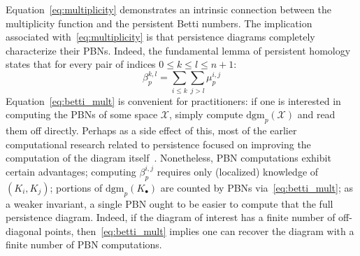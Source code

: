 Equation~\eqref{eq:multiplicity} demonstrates an intrinsic connection between the multiplicity function and the persistent Betti numbers. 
The implication associated with~\eqref{eq:multiplicity} is that persistence diagrams completely characterize their PBNs.
Indeed, the fundamental lemma of persistent homology~\cite{edelsbrunner2022computational} states that for every pair of indices $0 \leq k \leq l \leq n+1$: 
\begin{equation}\label{eq:betti_mult}
	\beta_p^{k,l} = \sum\limits_{i \leq k} \sum\limits_{j > l} \mu_p^{i,j}
\end{equation}
Equation~\eqref{eq:betti_mult} is convenient for practitioners: if one is interested in computing the PBNs of some space $\mathcal{X}$, simply compute $\mathrm{dgm}_p(\mathcal{X})$ and read them off directly. Perhaps as a side effect of this, most of the earlier computational research related to persistence focused on improving the computation of the diagram itself~\cite{}. 
Nonetheless, PBN computations exhibit certain advantages; 
computing $\beta_p^{i,j}$ requires only (localized) knowledge of $(K_i, K_j)$; %
portions of $\mathrm{dgm}_p(K_\bullet)$ are counted by PBNs via~\eqref{eq:betti_mult}; %
as a weaker invariant, a single PBN ought to be easier to compute that the full persistence diagram. %
Indeed, if the diagram of interest has a finite number of off-diagonal points, then~\eqref{eq:betti_mult} implies one can recover the diagram with a finite number of PBN computations. 

